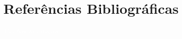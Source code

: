 \documentclass[11pt,fleqn]{book} %
\begin{document}
%

\chapter*{Referências Bibliográficas}\label{referencias}
\vspace{6em}
\begin{flushright}
	\textit{\textcolor{white}{Um bonita citação...}}
\end{flushright}
\vspace{12em}
\printbibliography[heading=bibempty]



%


\end{document}
